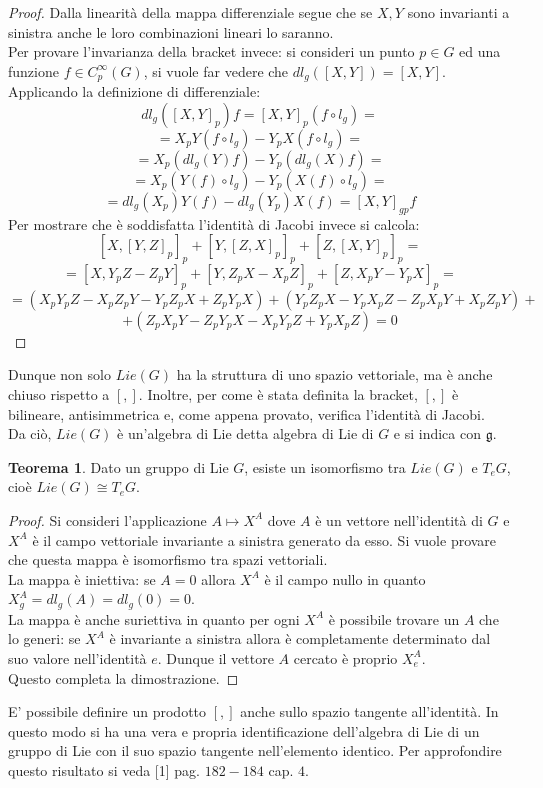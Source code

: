 \documentclass[12pt,a4paper]{report}
\theoremstyle{definition}
\newtheorem{Theo}[Def]{Teorema}
\theoremstyle{definition}
\theoremstyle{definition}
\theoremstyle{definition}
\begin{document}
\begin{proof}
	Dalla linearità della mappa differenziale segue che se $X,Y$ sono invarianti a sinistra anche le loro combinazioni lineari lo saranno.\\
	Per provare l'invarianza della bracket invece: si consideri un punto $p\in G$ ed una funzione $f\in C^\infty_p(G)$, si vuole far vedere che $dl_g([X,Y])=[X,Y]$.
	Applicando la definizione di differenziale: $$dl_g([X,Y]_p)f=[X,Y]_p(f\circ l_g)=$$$$=X_pY(f\circ l_g)-Y_pX(f\circ l_g)=$$$$=X_p(dl_g(Y)f)-Y_p(dl_g(X)f)=$$
	$$=X_p(Y(f)\circ l_g)-Y_p(X(f)\circ l_g)=$$
	$$=dl_g(X_p)Y(f)-dl_g(Y_p)X(f)=[X,Y]_{gp}f$$ 
	Per mostrare che è soddisfatta l'identità di Jacobi invece si calcola:
	$$[X,[Y,Z]_p]_p+[Y,[Z,X]_p]_p+[Z,[X,Y]_p]_p=$$
	$$=[X,Y_pZ-Z_pY]_p+[Y,Z_pX-X_pZ]_p+[Z,X_pY-Y_pX]_p=$$
	$$=(X_pY_pZ-X_pZ_pY-Y_pZ_pX+Z_pY_pX)+(Y_pZ_pX-Y_pX_pZ-Z_pX_pY+X_pZ_pY)+$$$$+(Z_pX_pY-Z_pY_pX-X_pY_pZ+Y_pX_pZ)=0$$
\end{proof}
Dunque non solo $Lie(G)$ ha la struttura di uno spazio vettoriale, ma è anche chiuso rispetto a $[,]$. Inoltre, per come è stata definita la bracket, $[,]$ è bilineare, antisimmetrica e, come appena provato, verifica l'identità di Jacobi.\\
Da ciò, $Lie(G)$ è un'algebra di Lie detta algebra di Lie di $G$ e si indica con $\mathfrak{g}$.
\begin{Theo}
	Dato un gruppo di Lie $G$, esiste un isomorfismo tra $Lie(G)$ e $T_eG$, cioè $Lie(G)\cong T_eG$.
\end{Theo}
\begin{proof}
	Si consideri l'applicazione $A\mapsto X^A$ dove $A$ è un vettore nell'identità di $G$ e $X^A$ è il campo vettoriale invariante a sinistra generato da esso. Si vuole provare che questa mappa è isomorfismo tra spazi vettoriali.\\
	La mappa è iniettiva: se $A=0$ allora $X^A$ è il campo nullo in quanto $X^A_g=dl_g(A)=dl_g(0)=0$.\\
	La mappa è anche suriettiva in quanto per ogni $X^A$ è possibile trovare un $A$ che lo generi: se $X^A$ è invariante a sinistra allora è completamente determinato dal suo valore nell'identità $e$. Dunque il vettore $A$ cercato è proprio $X^A_e$.\\
	Questo completa la dimostrazione.  
\end{proof}
E' possibile definire un prodotto $[,]$ anche sullo spazio tangente all'identità. In questo modo si ha una vera e propria identificazione dell'algebra di Lie di un gruppo di Lie con il suo spazio tangente nell'elemento identico. Per approfondire questo risultato si veda [1] pag. $182-184$ cap. $4$.
\end{document}
